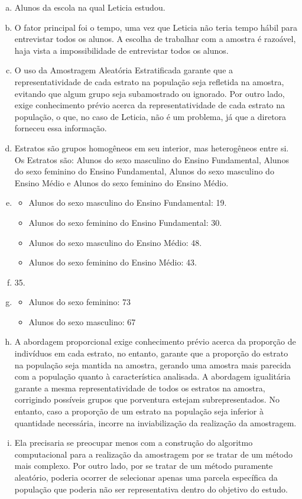 \documentclass[12pt]{article}
\begin{document}
\begin{enumerate}[a)]
    \item Alunos da escola na qual Leticia estudou.
    \item O fator principal foi o tempo, uma vez que Leticia não teria tempo hábil para entrevistar todos os alunos. 
    A escolha de trabalhar com a amostra é razoável, haja vista a impossibilidade de  entrevistar todos os alunos. 
    \item O uso da Amostragem Aleatória Estratificada garante que a representatividade de cada estrato na população seja refletida na amostra, evitando que algum grupo
    seja subamostrado ou ignorado. Por outro lado, exige conhecimento prévio acerca da representatividade de cada estrato na população, o que, no caso de Leticia, não é um problema, já que a diretora forneceu essa informação. 
    \item Estratos são grupos homogêneos em seu interior, mas heterogêneos entre si. Os Estratos são: Alunos do sexo masculino do Ensino Fundamental,
     Alunos do sexo feminino do Ensino Fundamental, Alunos do sexo masculino do Ensino Médio e Alunos do sexo feminino do Ensino Médio.
    \item  \begin{itemize}
        \item Alunos do sexo masculino do Ensino Fundamental: 19.
        \item Alunos do sexo feminino do Ensino Fundamental: 30.
        \item  Alunos do sexo masculino do Ensino Médio: 48.
        \item Alunos do sexo feminino do Ensino Médio: 43.
    \end{itemize}
    \item 35.
    \item \begin{itemize}
        \item Alunos do sexo feminino: 73
        \item Alunos do sexo masculino: 67
    \end{itemize} 
    \item A abordagem proporcional exige conhecimento prévio acerca da proporção de indivíduos em cada estrato, no entanto, garante que a proporção
     do estrato na população seja mantida na amostra, gerando uma amostra mais parecida com a população quanto à característica analisada. 
    A abordagem igualitária garante a mesma representatividade de todos os estratos na amostra, corrigindo possíveis grupos que porventura estejam subrepresentados.
    No entanto, caso a proporção de um estrato na população seja inferior à quantidade necessária, incorre na inviabilização da realização da amostragem. 
    \item Ela precisaria se preocupar menos com a construção do algoritmo computacional para a realização da amostragem por se tratar de um método mais complexo.
     Por outro lado, por se tratar de um método puramente aleatório, poderia ocorrer de selecionar apenas uma parcela específica da população que 
     poderia não ser representativa dentro do objetivo do estudo.  
\end{enumerate}
\end{document}
